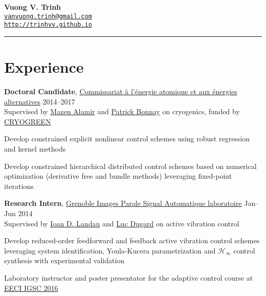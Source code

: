 \documentclass[a4paper,11pt]{article}
\begin{document}
{\hspace*{-\marginparsep minus \marginparwidth}%
  \begin{minipage}[t]{\textwidth+\marginparwidth+\marginparsep}%
    \centering
    {\LARGE \bfseries {Vuong V. Trinh}}\\
    \vspace{0.2cm}
    \href{mailto:vanvuong.trinh@gmail.com}{\texttt{vanvuong.trinh@gmail.com}} \\
    \href{https://trinhvv.github.io}{\texttt{http://trinhvv.github.io}}
    \rule{\columnwidth}{1.2pt}
\end{minipage}}

\vspace{0.2cm}

\section{Experience}

\textbf{Doctoral Candidate},
\href{http://www.cea.fr/}{Commissariat \`{a} l'\'{e}nergie atomique et aux \'{e}nergies alternatives}
\hfill {2014--2017}\\
Supervised by \href{http://www.mazenalamir.fr/}{Mazen Alamir} and \href{http://www.researchgate.net/profile/P_Bonnay}{Patrick Bonnay} on cryogenics, funded by \href{http://www.agence-nationale-recherche.fr/Project-ANR-13-SEED-0005}{CRYOGREEN}
\begin{innerlist}
  \item Develop constrained explicit nonlinear control schemes using robust regression and kernel methods
  \item Develop constrained hierarchical distributed control schemes based on numerical optimization (derivative free and bundle methods) leveraging fixed-point iterations
  \end{innerlist}

  \vspace{0.1cm}

  \textbf{Research Intern},
  \href{http://www.gipsa-lab.fr/}{Grenoble Images Parole Signal Automatique laboratoire}
  \hfill {Jan--Jun 2014}\\
  Supervised by \href{http://www.gipsa-lab.grenoble-inp.fr/~ioandore.landau/}{Ioan D. Landau} and \href{http://www.researchgate.net/profile/Luc_Dugard/}{Luc Dugard} on active vibration control
  \begin{innerlist}
  \item Develop reduced-order feedforward and feedback active vibration control schemes leveraging system identification, Youla-Kucera parametrization and $\mathcal{H}_{\infty}$ control synthesis with experimental validation
  \item  Laboratory instructor and poster presentator for the adaptive control course at \href{http://www.eeci-igsc.eu/}{EECI IGSC 2016}
  \end{innerlist}
\end{document}
